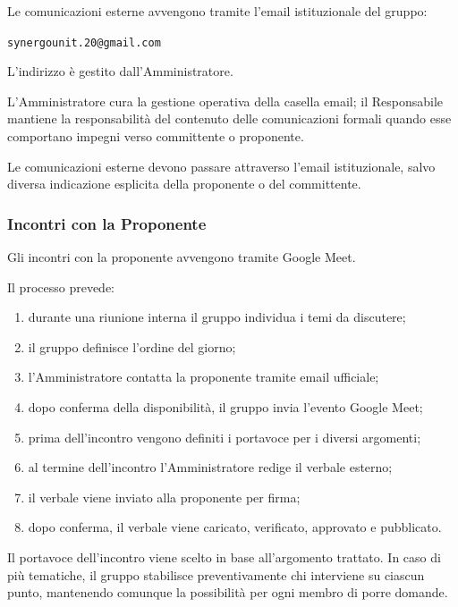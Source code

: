 Le comunicazioni esterne avvengono tramite l'email istituzionale del gruppo:

\begin{center}
    \texttt{synergounit.20@gmail.com}
\end{center}

L'indirizzo è gestito dall'Amministratore.

L'Amministratore cura la gestione operativa della casella email; il Responsabile
mantiene la responsabilità del contenuto delle comunicazioni formali quando esse
comportano impegni verso committente o proponente.

Le comunicazioni esterne devono passare attraverso l'email istituzionale, salvo
diversa indicazione esplicita della proponente o del committente.


\subsubsection{Incontri con la Proponente}

Gli incontri con la proponente avvengono tramite Google Meet.

Il processo prevede:

\begin{enumerate}
    \item durante una riunione interna il gruppo individua i temi da discutere;
    \item il gruppo definisce l'ordine del giorno;
    \item l'Amministratore contatta la proponente tramite email ufficiale;
    \item dopo conferma della disponibilità, il gruppo invia l'evento Google Meet;
    \item prima dell'incontro vengono definiti i portavoce per i diversi argomenti;
    \item al termine dell'incontro l'Amministratore redige il verbale esterno;
    \item il verbale viene inviato alla proponente per firma;
    \item dopo conferma, il verbale viene caricato, verificato, approvato e pubblicato.
\end{enumerate}

Il portavoce dell'incontro viene scelto in base all'argomento trattato. In caso di
più tematiche, il gruppo stabilisce preventivamente chi interviene su ciascun
punto, mantenendo comunque la possibilità per ogni membro di porre domande.

